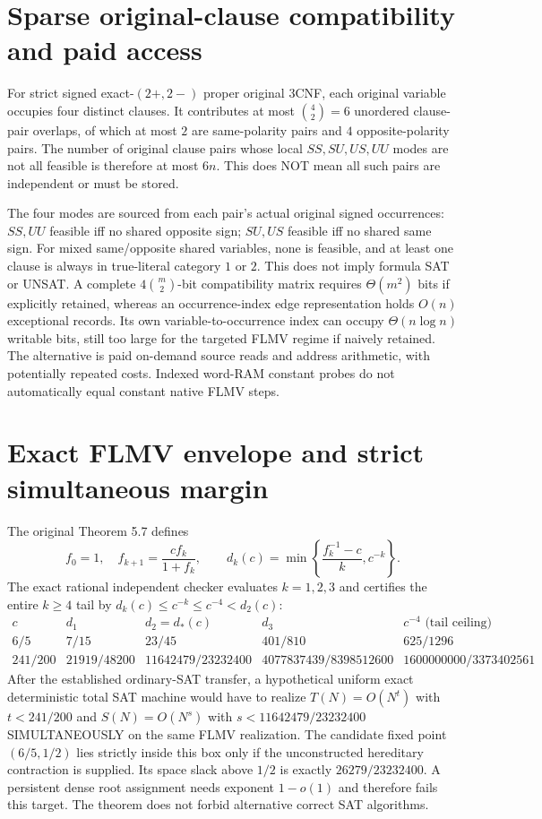 \documentclass[11pt]{article}
\begin{document}
\section{Sparse original-clause compatibility and paid access}
For strict signed exact-$(2+,2-)$ proper original 3CNF, each original variable occupies four distinct clauses. It contributes at most $\binom42=6$ unordered clause-pair overlaps, of which at most $2$ are same-polarity pairs and $4$ opposite-polarity pairs. The number of original clause pairs whose local $SS,SU,US,UU$ modes are not all feasible is therefore at most $6n$. This does NOT mean all such pairs are independent or must be stored.

The four modes are sourced from each pair's actual original signed occurrences: $SS,UU$ feasible iff no shared opposite sign; $SU,US$ feasible iff no shared same sign. For mixed same/opposite shared variables, none is feasible, and at least one clause is always in true-literal category $1$ or $2$. This does not imply formula SAT or UNSAT. A complete $4\binom m2$-bit compatibility matrix requires $\Theta(m^2)$ bits if explicitly retained, whereas an occurrence-index edge representation holds $O(n)$ exceptional records. Its own variable-to-occurrence index can occupy $\Theta(n\log n)$ writable bits, still too large for the targeted FLMV regime if naively retained. The alternative is paid on-demand source reads and address arithmetic, with potentially repeated costs. Indexed word-RAM constant probes do not automatically equal constant native FLMV steps.

\section{Exact FLMV envelope and strict simultaneous margin}
The original Theorem 5.7 defines
\[
f_0=1,\quad f_{k+1}=\frac{cf_k}{1+f_k},\qquad
d_k(c)=\min\left\{\frac{f_k^{-1}-c}{k},c^{-k}\right\}.
\]
The exact rational independent checker evaluates $k=1,2,3$ and certifies the entire $k\ge4$ tail by $d_k(c)\le c^{-k}\le c^{-4}<d_2(c)$:
\[
\begin{array}{c|cccc}
c&d_1&d_2=d_*(c)&d_3&c^{-4}\text{ (tail ceiling)}\\\hline
6/5&7/15&23/45&401/810&625/1296\\
241/200&21919/48200&11642479/23232400&4077837439/8398512600&1600000000/3373402561
\end{array}
\]
After the established ordinary-SAT transfer, a hypothetical uniform exact deterministic total SAT machine would have to realize $T(N)=O(N^t)$ with $t<241/200$ and $S(N)=O(N^s)$ with $s<11642479/23232400$ SIMULTANEOUSLY on the same FLMV realization. The candidate fixed point $(6/5,1/2)$ lies strictly inside this box only if the unconstructed hereditary contraction is supplied. Its space slack above $1/2$ is exactly $26279/23232400$. A persistent dense root assignment needs exponent $1-o(1)$ and therefore fails this target. The theorem does not forbid alternative correct SAT algorithms.
\end{document}
